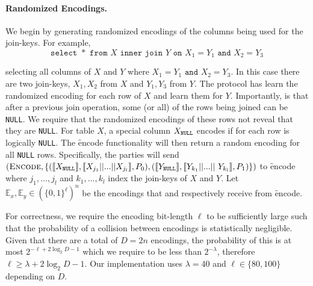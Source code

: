 \paragraph{Randomized Encodings.}
We begin by generating randomized encodings of the columns being used for the join-keys. For example, 
\iffullversion
$$
	\texttt{select }* \texttt{ from } X \texttt{ inner join } Y \texttt{ on } X_1 = Y_1 \texttt{ and } X_2 = Y_3
$$

\else
selecting all columns of $X$ and $Y$ where $X_1 = Y_1 \texttt{ and } X_2 = Y_3$.
\fi
In this case there are two join-keys, $X_1,X_2$ from $X$ and $Y_1,Y_3$ from $Y$. The protocol has  learn the randomized encoding for each row of $X$ and  learn them for $Y$. Importantly, is that after a previous join operation, some (or all) of the rows being joined can be \texttt{NULL}. We require that the randomized encodings of these rows not reveal that they are \texttt{NULL}. For table $X$, a special column $X_\texttt{NULL}$ encodes if for each row is logically \texttt{NULL}. The \f{encode} functionality will then return a random encoding for all \texttt{NULL} rows. Specifically, the parties will send $(\textsc{Encode}, \{(\share{\XNull}, \share{X_{j_1}||...||X_{j_l}}, \Party{0}), (\share{\YNull}, \share{Y_{k_1}||...||$ $Y_{k_l}}, \Party{1})\})$ to \f{encode} where $j_1,...,j_l$ and $k_1,...,k_l$ index the join-keys of $X$ and $Y$. Let $\mathbb{E}_x,\mathbb{E}_y\in(\{0,1\}^{\ell})^n$ be the encodings that  and  respectively receive from \f{encode}.


For correctness, we require the encoding bit-length $\ell$ to be sufficiently large such that the probability of a collision between encodings is statistically negligible. Given that there are a total of $D=2n$ encodings, the probability of this is at most $2^{-\ell+2\log_2 D-1}$ which we require to be less than $2^{-\lambda}$, therefore $\ell\geq \lambda+2\log_2 D -1$. Our implementation uses $\lambda=40$ and $\ell\in\{80,100\}$ depending on $D$.




